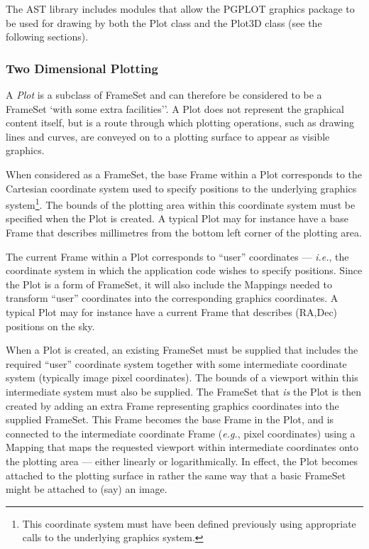 \documentclass[final,authoryear,5p,times,twocolumn]{elsarticle}
\begin{document}
The AST library includes modules that allow the PGPLOT graphics package to
be used for drawing by both the Plot class and the Plot3D class (see the
following sections).

\subsubsection{Two Dimensional Plotting}
A \emph{Plot} is a subclass of FrameSet and can therefore be considered
to be a FrameSet `with some extra facilities''. A Plot does not represent
the graphical content itself, but is a route through which plotting
operations, such as drawing lines and curves, are conveyed on to a
plotting surface to appear as visible graphics.

When considered as a FrameSet, the base Frame within a Plot corresponds
to the Cartesian coordinate system used to specify positions to the
underlying graphics system\footnote{This coordinate system must have been
defined previously using appropriate calls to the underlying graphics
system.}. The bounds of the plotting area within this coordinate system must
be specified when the Plot is created. A typical Plot may for instance
have a base Frame that describes millimetres from the bottom left corner
of the plotting area.

The current Frame within a Plot corresponds to ``user''  coordinates ---
\emph{i.e.}, the coordinate system in which the application code wishes to
specify positions. Since the Plot is a form of FrameSet, it will also
include the Mappings needed to transform ``user'' coordinates into the
corresponding graphics coordinates. A typical Plot may for instance
have a current Frame that describes (RA,Dec) positions on the sky.

When a Plot is created, an existing FrameSet must be supplied that
includes the required ``user'' coordinate system together with some
intermediate coordinate system (typically image pixel coordinates). The
bounds of a viewport within this intermediate system must also be
supplied. The FrameSet that \emph{is} the Plot is then created by adding
an extra Frame representing graphics coordinates into the supplied
FrameSet. This Frame becomes the base Frame in the Plot, and is connected
to the intermediate coordinate Frame (\emph{e.g.}, pixel coordinates)
using a Mapping that maps the requested viewport within intermediate
coordinates onto the plotting area --- either linearly or
logarithmically. In effect, the Plot becomes attached to the plotting
surface in rather the same way that a basic FrameSet might be attached
to (say) an image.
\end{document}
